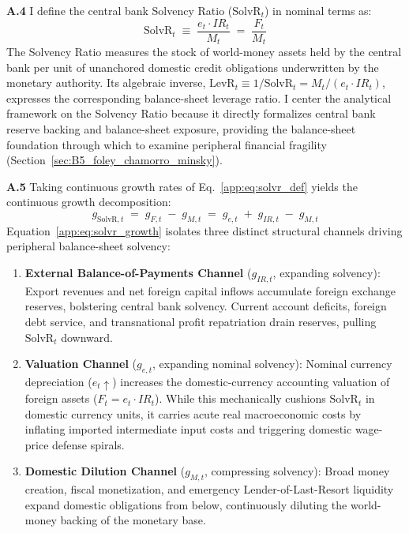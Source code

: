 \textbf{A.4} I define the central bank Solvency Ratio ($\text{SolvR}_t$) in nominal terms as:
\begin{equation}
	\label{app:eq:solvr_def}
	\text{SolvR}_t \;\equiv\; \frac{e_t \cdot IR_t}{M_t} \;=\; \frac{F_t}{M_t}
\end{equation}
The Solvency Ratio measures the stock of world-money assets held by the central bank per unit of unanchored domestic credit obligations underwritten by the monetary authority. Its algebraic inverse, $\text{LevR}_t \equiv 1/\text{SolvR}_t = M_t / (e_t \cdot IR_t)$, expresses the corresponding balance-sheet leverage ratio. I center the analytical framework on the Solvency Ratio because it directly formalizes central bank reserve backing and balance-sheet exposure, providing the balance-sheet foundation through which to examine peripheral financial fragility \citep{Foley2003,Chamorro2025} (Section~\ref{sec:B5_foley_chamorro_minsky}).

\textbf{A.5} Taking continuous growth rates of Eq.~\eqref{app:eq:solvr_def} yields the continuous growth decomposition:
\begin{equation}
	\label{app:eq:solvr_growth}
	g_{\text{SolvR},t} \;=\; g_{F,t} \;-\; g_{M,t} \;=\; g_{e,t} \;+\; g_{IR,t} \;-\; g_{M,t}
\end{equation}
Equation~\eqref{app:eq:solvr_growth} isolates three distinct structural channels driving peripheral balance-sheet solvency:
\begin{enumerate}[leftmargin=2em]
	\item \textbf{External Balance-of-Payments Channel} ($g_{IR,t}$, expanding solvency): Export revenues and net foreign capital inflows accumulate foreign exchange reserves, bolstering central bank solvency. Current account deficits, foreign debt service, and transnational profit repatriation drain reserves, pulling $\text{SolvR}_t$ downward.
	\item \textbf{Valuation Channel} ($g_{e,t}$, expanding nominal solvency): Nominal currency depreciation ($e_t \uparrow$) increases the domestic-currency accounting valuation of foreign assets ($F_t = e_t \cdot IR_t$). While this mechanically cushions $\text{SolvR}_t$ in domestic currency units, it carries acute real macroeconomic costs by inflating imported intermediate input costs and triggering domestic wage-price defense spirals.
	\item \textbf{Domestic Dilution Channel} ($g_{M,t}$, compressing solvency): Broad money creation, fiscal monetization, and emergency Lender-of-Last-Resort liquidity expand domestic obligations from below, continuously diluting the world-money backing of the monetary base.
\end{enumerate}


